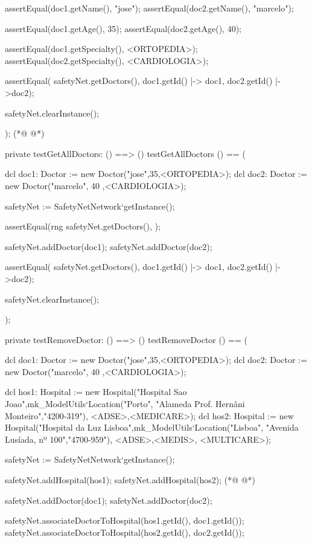 \begin{vdmpp}[breaklines=true]
  assertEqual(doc1.getName(), "jose");
  assertEqual(doc2.getName(), "marcelo");
  
  assertEqual(doc1.getAge(), 35);
  assertEqual(doc2.getAge(), 40); 
  
  assertEqual(doc1.getSpecialty(), <ORTOPEDIA>);
  assertEqual(doc2.getSpecialty(), <CARDIOLOGIA>);
  
  assertEqual( safetyNet.getDoctors(), {doc1.getId() |-> doc1, doc2.getId() |->doc2});
  
  safetyNet.clearInstance();
    
);
(*@
\label{testRemoveDoctor:162}
@*)

private testGetAllDoctors: () ==> ()
 testGetAllDoctors () == (
  
  dcl doc1: Doctor := new Doctor("jose",35,<ORTOPEDIA>);
  dcl doc2: Doctor := new Doctor("marcelo", 40 ,<CARDIOLOGIA>);
  
  safetyNet := SafetyNetNetwork`getInstance();

  assertEqual(rng safetyNet.getDoctors(), {});
   
  safetyNet.addDoctor(doc1);
  safetyNet.addDoctor(doc2);

  assertEqual( safetyNet.getDoctors(), {doc1.getId() |-> doc1, doc2.getId() |->doc2});
  
  safetyNet.clearInstance();
    
);

private testRemoveDoctor: () ==> ()
 testRemoveDoctor () == (
  
  dcl doc1: Doctor := new Doctor("jose",35,<ORTOPEDIA>);
  dcl doc2: Doctor := new Doctor("marcelo", 40 ,<CARDIOLOGIA>);
  
  dcl hos1: Hospital := new Hospital("Hospital Sao Joao",mk_ModelUtils`Location("Porto", "Alameda Prof. Hernâni Monteiro","4200-319"), {<ADSE>,<MEDICARE>});
  dcl hos2: Hospital := new Hospital("Hospital da Luz Lisboa",mk_ModelUtils`Location("Lisboa", "Avenida Lusíada, nº 100","4700-959"), {<ADSE>,<MEDIS>, <MULTICARE>});
  
  safetyNet := SafetyNetNetwork`getInstance();
   
  safetyNet.addHospital(hos1);
  safetyNet.addHospital(hos2);
(*@
\label{testAddHospital:195}
@*)
   
  safetyNet.addDoctor(doc1);
  safetyNet.addDoctor(doc2);
  
  safetyNet.associateDoctorToHospital(hos1.getId(), doc1.getId());
  safetyNet.associateDoctorToHospital(hos2.getId(), doc2.getId());
  

\end{vdmpp}
